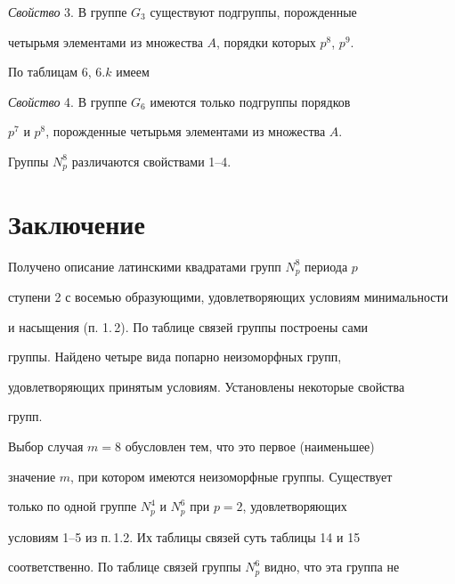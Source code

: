 {\it Свойство} 3. В группе $G_3$ существуют подгруппы, порожденные 


четырьмя элементами из множества $A$, порядки которых $p^8$, $p^9$.


\medskip





По таблицам 6, $6.k$ имеем


\medskip





{\it Свойство} 4. В группе $G_6$ имеются только подгруппы порядков


$p^7$ и $p^8$, порожденные четырьмя элементами из множества $A$.


\medskip





Группы $N^8_p$ различаются свойствами 1--4.








\section*{Заключение}





Получено описание латинскими квадратами групп $N^8_p$ периода $p$


ступени 2 с восемью образующими, удовлетворяющих условиям минимальности 


и насыщения (п. 1.\,2). По таблице связей группы построены сами


группы. Найдено четыре вида попарно неизоморфных групп, 


удовлетворяющих принятым условиям. Установлены некоторые свойства


групп.





Выбор случая $m=8$ обусловлен тем, что это первое (наименьшее)


значение $m$, при котором имеются неизоморфные группы. Существует 


только по одной группе $N^4_p$ и $N^6_p$ при $p=2$, удовлетворяющих


условиям 1--5 из п.\,1.2. Их таблицы связей суть таблицы 14 и 15 


соответственно. По таблице связей группы $N^6_p$ видно, что эта группа не


